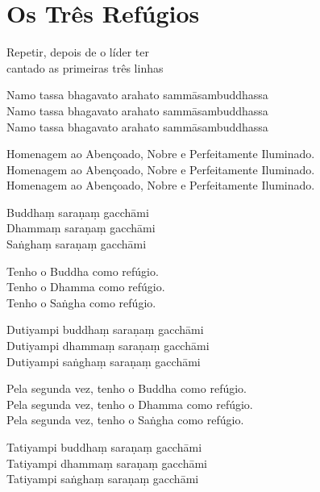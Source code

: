 \documentclass[
  babelLanguage=portuguese,
  final,
  showtrims,
]{chantingbook}
\begin{document}
\clearpage
\chapter{Os Três Refúgios}

\begin{instruction}
  Repetir, depois de o líder ter\\
  cantado as primeiras três linhas
\end{instruction}

Namo tassa bhagavato arahato sammāsambuddhassa\\
Namo tassa bhagavato arahato sammāsambuddhassa\\
Namo tassa bhagavato arahato sammāsambuddhassa

\begin{english}
  Homenagem ao Abençoado, Nobre e Perfeitamente Iluminado.\\
  Homenagem ao Abençoado, Nobre e Perfeitamente Iluminado.\\
  Homenagem ao Abençoado, Nobre e Perfeitamente Iluminado.
\end{english}

Buddhaṃ saraṇaṃ gacchāmi\\
Dhammaṃ saraṇaṃ gacchāmi\\
Saṅghaṃ saraṇaṃ gacchāmi

\begin{english}
  Tenho o Buddha como refúgio.\\
  Tenho o Dhamma como refúgio.\\
  Tenho o Saṅgha como refúgio.
\end{english}

Dutiyampi buddhaṃ saraṇaṃ gacchāmi\\
Dutiyampi dhammaṃ saraṇaṃ gacchāmi\\
Dutiyampi saṅghaṃ saraṇaṃ gacchāmi

\begin{english}
  Pela segunda vez, tenho o Buddha como refúgio.\\
  Pela segunda vez, tenho o Dhamma como refúgio.\\
  Pela segunda vez, tenho o Saṅgha como refúgio.
\end{english}

Tatiyampi buddhaṃ saraṇaṃ gacchāmi\\
Tatiyampi dhammaṃ saraṇaṃ gacchāmi\\
Tatiyampi saṅghaṃ saraṇaṃ gacchāmi

\clearpage
\end{document}

